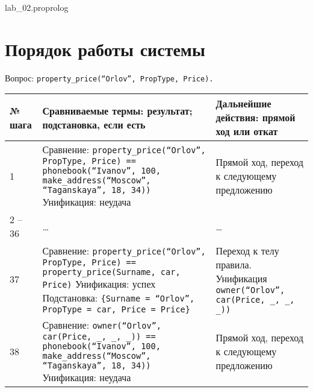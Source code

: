 	{lab_02.pro}{prolog}{}

\clearpage
\section{Порядок работы системы}

Вопрос: \texttt{property\_price(``Orlov'', PropType, Price).}

	\footnotesize
	\begin{xltabular}{\textwidth}{|l|X|Y|}
		\hline
		\textbf{№ шага} &
		\textbf{Сравниваемые термы: результат; подстановка, если есть} &
		\textbf{Дальнейшие действия: прямой ход или откат} \\ \hline
		
		1 & 
		Сравнение:\newline
		\texttt{property\_price(``Orlov'', PropType, Price) == phonebook(``Ivanov'', 100, make\_address(``Moscow'', ``Taganskaya'', 18, 34))} \newline\newline
		Унификация: неудача &
		Прямой ход, переход к следующему предложению \\ \hline
		
		2 -- 36 & \centering \dots & \dots \\ \hline
		
		37 &
		Сравнение:\newline
		\texttt{property\_price(``Orlov'', PropType, Price) == property\_price(Surname, car, Price)} \newline\newline
		Унификация: успех \newline\newline
		Подстановка:\newline
		\texttt{\{Surname = ``Orlov'', PropType = car, Price = Price\}} & 
		Переход к телу правила. \newline\newline
		Унификация\newline
		\texttt{owner(``Orlov'', car(Price, \_, \_, \_))} \\ \hline
		
		38 &
		Сравнение:\newline
		\texttt{owner(``Orlov'', car(Price, \_, \_,~\_)) == phonebook(``Ivanov'', 100, make\_address(``Moscow'', ``Taganskaya'', 18, 34))} \newline\newline
		Унификация: неудача &
		Прямой ход, переход к следующему предложению \\ \hline
		

\end{xltabular}
